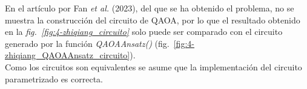 En el artículo por Fan \textit{et al.} (2023)\cite{solving_shortest_path_with_qaoa}, del que se ha obtenido el problema, no se muestra la construcción del circuito de QAOA, por lo que el resultado obtenido en la \textit{fig.~\ref{fig:4-zhiqiang_circuito}} solo puede ser comparado con el circuito generado por la función \textit{QAOAAnsatz()} (fig.~\ref{fig:4-zhiqiang_QAOAAnsatz_circuito}).
\\
Como los circuitos son equivalentes se asume que la implementación del circuito parametrizado es correcta.


